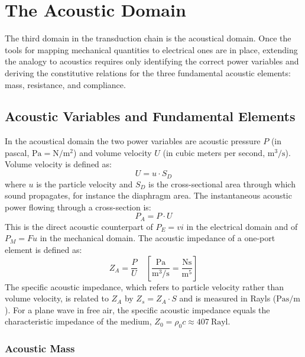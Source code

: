 
\graphicspath{{00_Images/03_chapter/}}

\chapter{The Acoustic Domain}
\label{ch:acoustical_twoport}

The third domain in the transduction chain is the acoustical domain. Once the tools for mapping mechanical quantities to electrical ones are in place, extending the analogy to acoustics requires only identifying the correct power variables and deriving the constitutive relations for the three fundamental acoustic elements: mass, resistance, and compliance.

\section{Acoustic Variables and Fundamental Elements}
\label{sc:31}

In the acoustical domain the two power variables are acoustic pressure \(P\) (in pascal, \(\si{\pascal} = \si{\newton\per\meter\squared}\)) and volume velocity \(U\) (in cubic meters per second, \(\si{\cubic\meter\per\second}\)). Volume velocity is defined as:
\[
U = u \cdot S_D
\]
where \(u\) is the particle velocity and \(S_D\) is the cross-sectional area through which sound propagates, for instance the diaphragm area. The instantaneous acoustic power flowing through a cross-section is:
\[
P_A = P \cdot U
\]
This is the direct acoustic counterpart of \(P_E = v i\) in the electrical domain and of \(P_M = F u\) in the mechanical domain. The acoustic impedance of a one-port element is defined as:
\[
Z_A = \frac{P}{U} \quad \left[\frac{\si{\pascal}}{\si{\cubic\meter\per\second}} = \frac{\si{\newton\second}}{\si{\meter\tothe{5}}}\right]
\]
The specific acoustic impedance, which refers to particle velocity rather than volume velocity, is related to \(Z_A\) by \(Z_s = Z_A \cdot S\) and is measured in Rayls (\(\si{\pascal\second\per\meter}\)). For a plane wave in free air, the specific acoustic impedance equals the characteristic impedance of the medium, \(Z_0 = \rho_0 c \approx \SI{407}{\text{Rayl}}\).

\subsection{Acoustic Mass}
\label{ssc:311}

